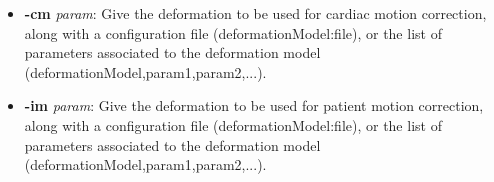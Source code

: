 \documentclass[a4paper, 11pt]{article}
\begin{document}
\begin{itemize}
\item \textbf{-cm} \textit{param}: Give the deformation to be used for cardiac motion correction, along with a configuration file (deformationModel:file), or the list of parameters associated to the deformation model (deformationModel,param1,param2,...).
\item \textbf{-im} \textit{param}: Give the deformation to be used for patient motion correction, along with a configuration file (deformationModel:file), or the list of parameters associated to the deformation model (deformationModel,param1,param2,...).
\end{itemize}


 
% 

\end{document}
